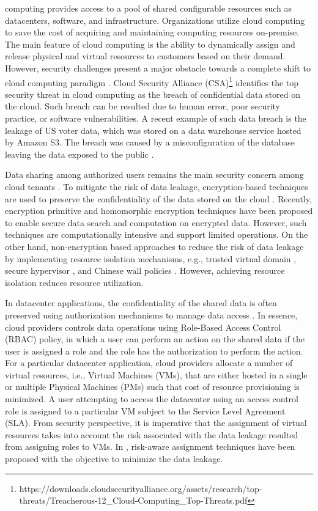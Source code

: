  computing provides access to a pool of shared configurable resources such as datacenters, software, and infrastructure. Organizations utilize cloud computing to save the cost of acquiring and maintaining computing resources on-premise. The main feature of cloud computing is the ability to dynamically assign and release physical and virtual resources to customers based on their demand. However, security challenges present a major obstacle towards a complete shift to cloud computing paradigm \cite{DBLP:journals/cit/HuQLGTMBH11}. Cloud Security Alliance (CSA)\footnote{https://downloads.cloudsecurityalliance.org/assets/research/top-threats/Treacherous-12\_Cloud-Computing\_Top-Threats.pdf} identifies the top security threat in cloud computing as the breach of confidential data stored on the cloud. Such breach can be resulted due to human error, poor security practice, or software vulnerabilities. A recent example of such data breach is the leakage of US voter data, which was stored on a data warehouse service hosted by Amazon S3. The breach was caused by a misconfiguration of the database leaving the data exposed to the public \cite{upguard2017}. 

Data sharing among authorized users remains the main security concern among cloud tenants \cite{takabi2010security}. To mitigate the risk of data leakage, encryption-based techniques are used to preserve the confidentiality of the data stored on the cloud \cite{tang2016ensuring}. Recently, encryption primitive and homomorphic encryption techniques have been proposed to enable secure data search and computation on encrypted data. However, such techniques are computationally intensive and support limited operations. On the other hand, non-encryption based approaches to reduce the risk of data leakage by implementing resource isolation mechanisms, e.g., trusted virtual domain \cite{catuogno2010trusted}, secure hypervisor \cite{steinberg2010nova}, and Chinese wall policies \cite{berger2009security}. However, achieving resource isolation reduces resource utilization. 

In datacenter applications, the confidentiality of the shared data is often preserved using authorization mechanisms to manage data access \cite{alcaraz10}. In essence, cloud providers controls data operations using Role-Based Access Control (RBAC) policy, in which a user can perform an action on the shared data if the user is assigned a role and the role has the authorization to perform the action. For a particular datacenter application, cloud providers allocate a number of virtual resources, i.e., Virtual Machines (VMs), that are either hosted in a single or multiple Physical Machines (PMs) such that cost of resource provisioning is minimized. A user attempting to access the datacenter using an access control role is assigned to a particular VM subject to the Service Level Agreement (SLA). From security perspective, it is imperative that the assignment of virtual resources takes into account the risk associated with the data leakage resulted from assigning roles to VMs. In \cite{almutairi2014risk,almutairi2015risk}, risk-aware assignment techniques have been proposed with the objective to minimize the data leakage. 

